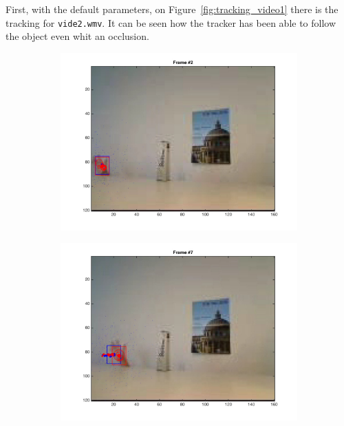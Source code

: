 \documentclass{ethz_report}
\begin{document}
First, with the default parameters, on Figure~\ref{fig:tracking_video1} there is the tracking for \texttt{vide2.wmv}. It can be seen how the tracker has been able to follow the object even whit an occlusion.

\begin{figure}[H]
    \centering
    \begin{subfigure}[b]{.25\textwidth}
        \centering
        \includegraphics[width=1\linewidth]{images/video2__1}
    \end{subfigure}%
    \begin{subfigure}[b]{.25\textwidth}
        \centering
        \includegraphics[width=1\linewidth]{images/video2__6}
    \end{subfigure}%

\end{figure}
\end{document}
